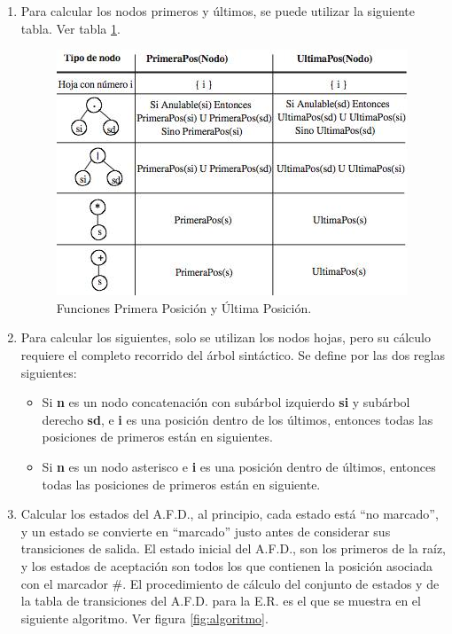\documentclass{report}
\begin{document}
\begin{enumerate}
	\item Para calcular los nodos primeros y últimos, se puede utilizar la siguiente tabla. Ver tabla \ref{fig:primeros y ultimos}.

	\begin{figure}
		\centering
		\includegraphics[scale=0.5]{img/tabla2.jpg}
		\caption{Funciones Primera Posición y Última Posición.}
		\label{fig:primeros y ultimos}
	\end{figure}

	\item Para calcular los siguientes, solo se utilizan los nodos hojas, pero su cálculo requiere el completo recorrido del árbol sintáctico. Se define por las dos reglas siguientes:

	\begin{itemize}
		\item Si {\bf n} es un nodo concatenación con subárbol izquierdo {\bf si} y subárbol derecho {\bf sd}, e {\bf i} es una posición dentro de los últimos, entonces todas las posiciones de primeros están en siguientes.
		\item Si  {\bf n} es un nodo asterisco e {\bf i} es una posición dentro de últimos, entonces todas las posiciones de primeros están en siguiente.
	\end{itemize}

	\item Calcular los estados del A.F.D., al principio, cada estado está “no marcado”, y un estado se convierte en “marcado” justo antes de considerar sus transiciones de salida. El estado inicial del A.F.D., son los primeros de la raíz, y los estados de aceptación son todos los que contienen la posición asociada con el marcador \#. El procedimiento de cálculo del conjunto de estados y de la tabla de transiciones del A.F.D. para la E.R. es el que se muestra en el siguiente algoritmo. Ver figura \ref{fig:algoritmo}.


\end{enumerate}
\end{document}
